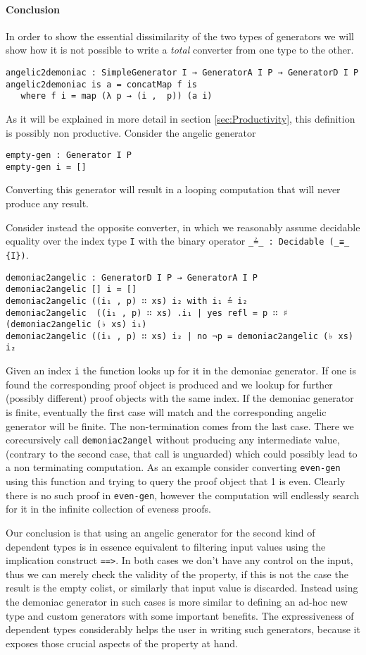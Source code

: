 \documentclass[10pt,a4paper]{article}
\begin{document}
\paragraph{Conclusion}
In order to show the essential dissimilarity of the two types of generators we will show how it is not possible to write a \emph{total} converter from one type to the other.
\begin{verbatim}
angelic2demoniac : SimpleGenerator I → GeneratorA I P → GeneratorD I P
angelic2demoniac is a = concatMap f is
   where f i = map (λ p → (i ,  p)) (a i) 
\end{verbatim}
As it will be explained in more detail in section \ref{sec:Productivity}, this definition is possibly non productive. Consider the angelic generator
\begin{verbatim}
empty-gen : Generator I P
empty-gen i = [] 
\end{verbatim}
Converting this generator will result in a looping computation that will never produce any result.

Consider instead the opposite converter, in which we reasonably assume decidable equality over the index type \texttt{I} with the binary operator \texttt{\_≟\_ :\ Decidable (\_≡\_  \{I\})}.
\begin{verbatim}
demoniac2angelic : GeneratorD I P → GeneratorA I P
demoniac2angelic [] i = []
demoniac2angelic ((i₁ , p) ∷ xs) i₂ with i₁ ≟ i₂
demoniac2angelic  ((i₁ , p) ∷ xs) .i₁ | yes refl = p ∷ ♯ (demoniac2angelic (♭ xs) i₁)
demoniac2angelic ((i₁ , p) ∷ xs) i₂ | no ¬p = demoniac2angelic (♭ xs) i₂
\end{verbatim}
Given an index \texttt{i} the function looks up for it in the demoniac generator. If one is found the corresponding proof object is produced and we lookup for further (possibly different) proof objects with the same index.
If the demoniac generator is finite, eventually the first case will match and the corresponding angelic generator will be finite. The non-termination comes from the last case. There we corecursively call \texttt{demoniac2angel} without producing any intermediate value, (contrary to the second case, that call is unguarded) which could possibly lead to a non terminating computation.
As an example consider converting \texttt{even-gen} using this function and trying to query the proof object that 1 is even. Clearly there is no such proof in \texttt{even-gen}, however the computation will endlessly search for it in the infinite collection of eveness proofs.  
 
Our conclusion is that using an angelic generator for the second kind of dependent types is in essence equivalent to filtering input values using the implication construct \texttt{==>}. In both cases we don't have any control on the input, thus we can merely check the validity of the property, if this is not the case the result is the empty colist, or similarly that input value is discarded.
Instead using the demoniac generator in such cases is more similar to defining an ad-hoc new type and custom generators with some important benefits.
The expressiveness of dependent types considerably helps the user in writing such generators, because it exposes those crucial aspects of the property at hand.
\end{document}
